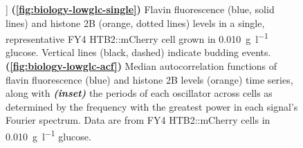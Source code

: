 \begin{figure}
  ]{
    \textbf{(\ref{fig:biology-lowglc-single})}
    Flavin fluorescence (blue, solid lines) and histone 2B (orange, dotted lines) levels in a single, representative FY4 HTB2::mCherry cell grown in \SI{0.010}{\gram~\litre^{-1}} glucose.
    Vertical lines (black, dashed) indicate budding events.
    \textbf{(\ref{fig:biology-lowglc-acf})}
    Median autocorrelation functions of flavin fluorescence (blue) and histone 2B levels (orange) time series, along with \textit{\textbf{(inset)}} the periods of each oscillator across cells as determined by the frequency with the greatest power in each signal's Fourier spectrum.
    Data are from FY4 HTB2::mCherry cells in \SI{0.010}{\gram~\litre^{-1}} glucose.
  }
  \label{fig:biology-lowglc}
\end{figure}


